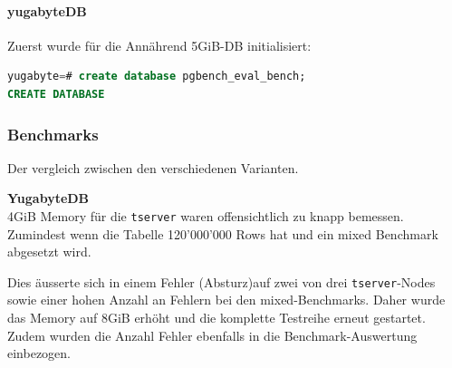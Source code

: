 
\begin{flushleft}
    \paragraph{yugabyteDB}
    Zuerst wurde für die Annährend 5GiB-DB initialisiert:
\lstset{style=gra_codestyle}
\begin{lstlisting}[language=sql, caption=yugabyteDB - Benchmarking - DB erstellen,captionpos=b,label={lst:yugabytedb-benchmarking-create-db},breaklines=true]
yugabyte=# create database pgbench_eval_bench;
CREATE DATABASE
\end{lstlisting}


    \subsubsection{Benchmarks}
    Der vergleich zwischen den verschiedenen Varianten.\\
\end{flushleft}
\begin{flushleft}
    \begin{warning}
        \textbf{YugabyteDB}\\
        4GiB Memory für die \texttt{tserver} waren offensichtlich zu knapp bemessen.
        Zumindest wenn die Tabelle 120'000'000 Rows hat und ein mixed Benchmark abgesetzt wird.

        Dies äusserte sich in einem Fehler (Absturz)auf zwei von drei \texttt{tserver}-Nodes sowie einer hohen Anzahl an Fehlern bei den mixed-Benchmarks.
        Daher wurde das Memory auf 8GiB erhöht und die komplette Testreihe erneut gestartet.
        Zudem wurden die Anzahl Fehler ebenfalls in die Benchmark-Auswertung einbezogen.
    \end{warning}
\end{flushleft}
